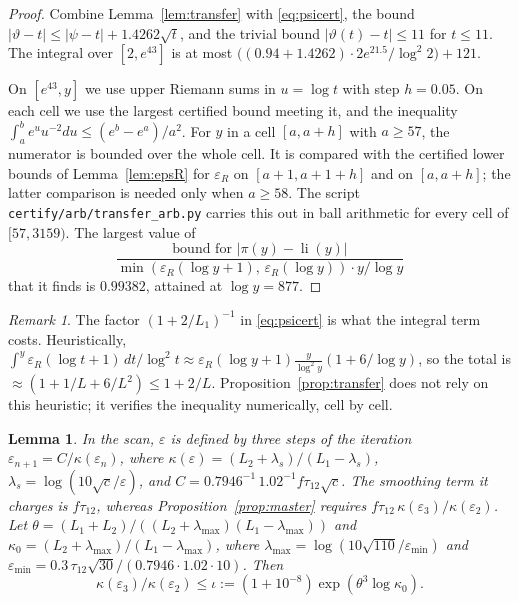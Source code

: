 \documentclass[11pt]{amsart}
\numberwithin{equation}{section}
\newtheorem{lemma}[theorem]{Lemma}
\theoremstyle{definition}
\theoremstyle{remark}
\newtheorem{remark}[theorem]{Remark}
\newcommand{\li}{\operatorname{li}}
\newcommand{\eps}{\varepsilon}
\newcommand{\code}[1]{\texttt{#1}}
\begin{document}
\begin{proof}
Combine Lemma~\ref{lem:transfer} with \eqref{eq:psicert}, the bound $|\vartheta - t| \le |\psi - t| + 1.4262\sqrt t$, and the trivial bound $|\vartheta(t) - t| \le 11$ for $t \le 11$.
The integral over $[2, e^{43}]$ is at most
$\big((0.94 + 1.4262)\cdot 2 e^{21.5}/\log^2 2\big) + 121$.

On $[e^{43}, y]$ we use upper Riemann sums in $u = \log t$ with step $h = 0.05$.
On each cell we use the largest certified bound meeting it, and the inequality $\int_a^b e^u u^{-2}du \le (e^b - e^a)/a^2$.
For $y$ in a cell $[a, a+h]$ with $a \ge 57$, the numerator is bounded over the whole cell.
It is compared with the certified lower bounds of Lemma~\ref{lem:epsR} for $\eps_R$ on $[a+1, a+1+h]$ and on $[a, a+h]$; the latter comparison is needed only when $a \ge 58$.
The script \code{certify/arb/transfer\_arb.py} carries this out in ball arithmetic for every cell of $[57, 3159)$.
The largest value of
\[
\frac{\text{bound for } |\pi(y) - \li(y)|}{\min(\eps_R(\log y+1),\,\eps_R(\log y))\cdot y/\log y}
\]
that it finds is $0.99382$, attained at $\log y = 877$.
\end{proof}

\begin{remark}
The factor $(1+2/L_1)^{-1}$ in \eqref{eq:psicert} is what the integral term costs.
Heuristically, $\int^{y}\eps_R(\log t+1)\,dt/\log^2 t \approx \eps_R(\log y+1)\frac{y}{\log^2 y}(1 + 6/\log y)$, so the total is $\approx(1 + 1/L + 6/L^2) \le 1 + 2/L$.
Proposition~\ref{prop:transfer} does not rely on this heuristic; it verifies the inequality numerically, cell by cell.
\end{remark}

\begin{lemma}\label{lem:iota}
In the scan, $\eps$ is defined by three steps of the iteration $\eps_{n+1} = C/\kappa(\eps_n)$, where
$\kappa(\eps) = (L_2 + \lambda_s)/(L_1 - \lambda_s)$, $\lambda_s = \log(10\sqrt c/\eps)$, and $C = 0.7946^{-1}\,1.02^{-1}f\tau_{12}\sqrt c$.
The smoothing term it charges is $f\tau_{12}$, whereas Proposition~\ref{prop:master} requires $f\tau_{12}\,\kappa(\eps_3)/\kappa(\eps_2)$.
Let $\theta = (L_1+L_2)/((L_2+\lambda_{\max})(L_1-\lambda_{\max}))$ and $\kappa_0 = (L_2+\lambda_{\max})/(L_1-\lambda_{\max})$, where $\lambda_{\max} = \log(10\sqrt{110}/\eps_{\min})$ and $\eps_{\min} = 0.3\,\tau_{12}\sqrt{30}/(0.7946\cdot1.02\cdot 10)$.
Then
\[
\kappa(\eps_3)/\kappa(\eps_2) \le \iota := (1 + 10^{-8})\exp(\theta^3\log\kappa_0) .
\]
\end{lemma}
\end{document}
